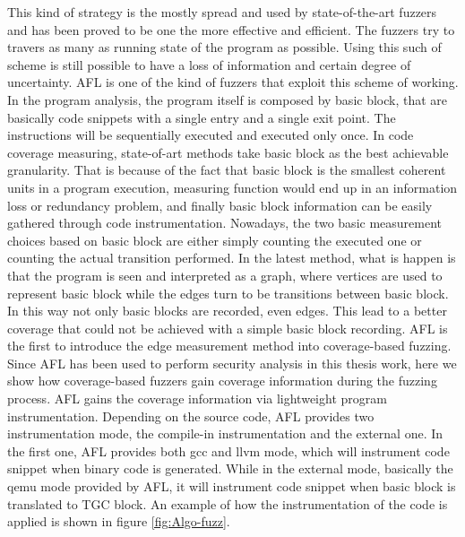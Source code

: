 This kind of strategy is the mostly spread and used by state-of-the-art fuzzers and has been proved to be one the more effective and efficient.
The fuzzers try to travers as many as running state of the program as possible. Using this such of scheme is still possible to have a loss of information and certain degree of uncertainty.
AFL is one of the kind of fuzzers that exploit this scheme of working.
In the program analysis, the program itself is composed by basic block, that are basically code snippets with a single entry and a single exit point.
The instructions will be sequentially executed and executed only once. In code coverage measuring, state-of-art methods take basic block as the best achievable granularity. That is because of the fact
that basic block is the smallest coherent units in a program execution, measuring function would end up in an information loss or redundancy problem, and finally basic block information can be easily gathered
through code instrumentation. Nowadays, the two basic measurement choices based on basic block are either simply counting the executed one or counting the actual transition performed. In the latest method, what is happen
is that the program is seen and interpreted as a graph, where vertices are used to represent basic block while the edges turn to be transitions between basic block. In this way not only basic blocks are recorded, even edges.
This lead to a better coverage that could not be achieved with a simple basic block recording.
AFL is the first to introduce the edge measurement method into coverage-based fuzzing. Since AFL has been used to perform security analysis in this thesis work, here we show how coverage-based fuzzers
gain coverage information during the fuzzing process. AFL gains the coverage information via lightweight program instrumentation. 
Depending on the source code, AFL provides two instrumentation mode, the compile-in instrumentation and the external one. In the first one, AFL provides
both gcc and llvm mode, which will instrument code snippet when binary code is generated. While in the external mode, basically the qemu mode provided by AFL,
it will instrument code snippet when basic block is translated to TGC block. An example of how the instrumentation of the code is applied is shown in figure \ref{fig:Algo-fuzz}. 

